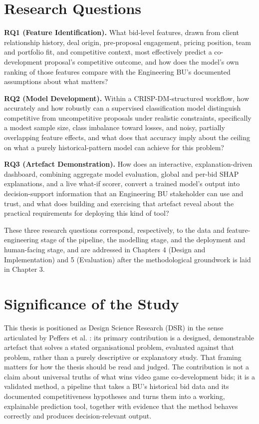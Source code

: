 \hypertarget{research-questions}{%
\section{Research Questions}\label{research-questions}}

\textbf{RQ1 (Feature Identification).} What bid-level features, drawn
from client relationship history, deal origin, pre-proposal engagement,
pricing position, team and portfolio fit, and competitive context, most
effectively predict a co-development proposal's competitive outcome, and
how does the model's own ranking of those features compare with the
Engineering BU's documented assumptions about what matters?

\textbf{RQ2 (Model Development).} Within a CRISP-DM-structured workflow,
how accurately and how robustly can a supervised classification model
distinguish competitive from uncompetitive proposals under realistic
constraints, specifically a modest sample size, class imbalance toward
losses, and noisy, partially overlapping feature effects, and what does
that accuracy imply about the ceiling on what a purely
historical-pattern model can achieve for this problem?

\textbf{RQ3 (Artefact Demonstration).} How does an interactive,
explanation-driven dashboard, combining aggregate model evaluation,
global and per-bid SHAP explanations, and a live what-if scorer, convert
a trained model's output into decision-support information that an
Engineering BU stakeholder can use and trust, and what does building and
exercising that artefact reveal about the practical requirements for
deploying this kind of tool?

These three research questions correspond, respectively, to the data and
feature-engineering stage of the pipeline, the modelling stage, and the
deployment and human-facing stage, and are addressed in Chapters 4
(Design and Implementation) and 5 (Evaluation) after the methodological
groundwork is laid in Chapter 3.

\hypertarget{significance-of-the-study}{%
\section{Significance of the Study}\label{significance-of-the-study}}

This thesis is positioned as Design Science Research (DSR) in the sense
articulated by Peffers et al. \citep{peffers2007design}: its primary
contribution is a designed, demonstrable artefact that solves a stated
organisational problem, evaluated against that problem, rather than a
purely descriptive or explanatory study. That framing matters for how
the thesis should be read and judged. The contribution is not a claim
about universal truths of what wins video game co-development bids; it
is a validated method, a pipeline that takes a BU's historical bid data
and its documented competitiveness hypotheses and turns them into a
working, explainable prediction tool, together with evidence that the
method behaves correctly and produces decision-relevant output.

